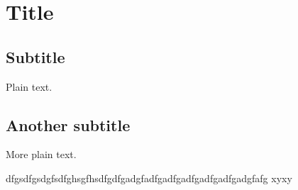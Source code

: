 \documentclass{article}
\begin{document}
\section{Title}

\subsection{Subtitle}

Plain text.

\subsection{Another subtitle}

More plain text.


dfgsdfgsdgfsdfghsgfhsdfgdfgadgfadfgadfgadfgadfgadfgadgfafg
xyxy
\end{document}
